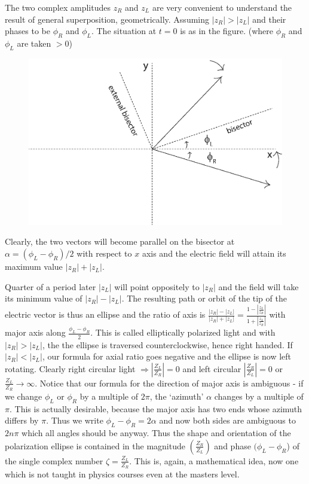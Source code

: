 The two complex amplitudes $z_R$ and $z_L$ are very convenient to understand
the result of general superposition, geometrically. Assuming $| z_R |>| z_L |$ and
their phases to be $\phi_R$ and $\phi_L$. The situation at $t = 0$ is as in the figure. (where $\phi_R$ and $\phi_L$ are taken $> 0$)
\begin{figure}[H]
\centering
\includegraphics[scale=0.2]{src/images/chap26/3.jpg}
\end{figure}

Clearly, the two vectors will become parallel on the bisector at $\alpha = (\phi_L -\phi_R)/2$ 
with respect to $x$ axis and the electric field will attain its maximum value
$| z_R | + | z_L |$.

Quarter of a period later $| z_L |$ will point oppositely to $| z_R |$ and the field
will take its minimum value of $| z_R | - | z_L |$. The resulting path or orbit of the
tip of the electric vector is thus an ellipse and the ratio of axis is $\frac{|z_R| - |z_L|}{|z_R| + |z_L|} = \frac{1-|\frac{z_L}{z_R}|}{1+|\frac{z_L}{z_R}|}$
with major axis along $\frac{\phi_L -\phi_R}{2}$. This is called elliptically polarized light
and with $|z_R | > |z_L |$, the the ellipse is traversed counterclockwise, hence right
handed. If $|z_R | < |z_L |$, our formula for axial ratio goes negative and the ellipse
is now left rotating. Clearly right circular light $\Rightarrow |\frac{Z_L}{Z_R}| = 0$ and left circular $|\frac{Z_R}{Z_L}| =0$ or $\frac{Z_L}{Z_R} \to \infty$. 
 Notice that our formula for the direction of major axis is
ambiguous - if we change $\phi_L$ or $\phi_R$ by a multiple of $2\pi$, the `azimuth' $\alpha$ changes
by a multiple of $\pi$. This is actually desirable, because the major axis has two
ends whose azimuth differs by $\pi$. Thus we write $\phi_L - \phi_R = 2\alpha$ and now both
sides are ambiguous to $2n\pi$ which all angles should be anyway. Thus the shape
and orientation of the polarization ellipse is contained in the magnitude $\left(\frac{Z_R}{Z_L} \right)$
and phase $(\phi_L - \phi_R$) of the single complex number $\zeta = \frac{Z_L}{Z_R}$. This is, again, a
mathematical idea, now one which is not taught in physics courses even at the
masters level.


